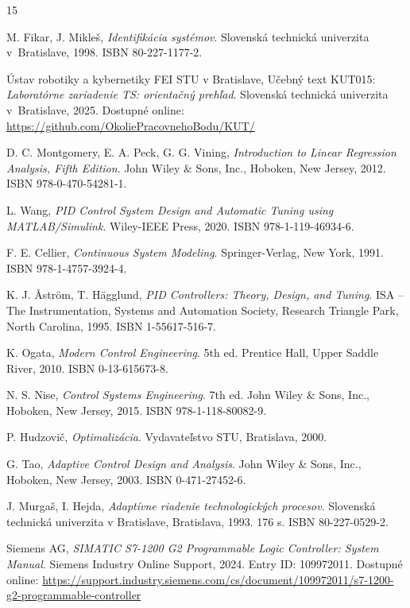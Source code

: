 \clearpage
{}

\begin{thebibliography}{15}

M. Fikar, J. Mikleš, \textit{Identifikácia systémov}.  
Slovenská technická univerzita v~Bratislave, 1998.  
ISBN 80-227-1177-2.  

Ústav robotiky a kybernetiky FEI STU v Bratislave, Učebný text KUT015: \textit{Laboratórne zariadenie TS: orientačný prehľad}.  
Slovenská technická univerzita v~Bratislave, 2025.  
Dostupné online:  
\url{https://github.com/OkoliePracovnehoBodu/KUT/}

D. C. Montgomery, E. A. Peck, G. G. Vining,  
\textit{Introduction to Linear Regression Analysis, Fifth Edition}.  
John Wiley \& Sons, Inc., Hoboken, New Jersey, 2012.  
ISBN 978-0-470-54281-1.  

L. Wang, \textit{PID Control System Design and Automatic Tuning using MATLAB/Simulink}.  
Wiley-IEEE Press, 2020.  
ISBN 978-1-119-46934-6.

F. E. Cellier, \textit{Continuous System Modeling}.  
Springer-Verlag, New York, 1991.  
ISBN 978-1-4757-3924-4.

K. J. Åström, T. Hägglund, \textit{PID Controllers: Theory, Design, and Tuning}.  
ISA -- The Instrumentation, Systems and Automation Society, Research Triangle Park, North Carolina, 1995.  
ISBN 1-55617-516-7.

K. Ogata, \textit{Modern Control Engineering}.  
5th ed.  
Prentice Hall, Upper Saddle River, 2010.  
ISBN 0-13-615673-8.

N. S. Nise, \textit{Control Systems Engineering}.  
7th ed.  
John Wiley \& Sons, Inc., Hoboken, New Jersey, 2015.  
ISBN 978-1-118-80082-9.

P. Hudzovič, \textit{Optimalizácia}.  
Vydavateľstvo STU, Bratislava, 2000.

G. Tao, \textit{Adaptive Control Design and Analysis}.  
John Wiley \& Sons, Inc., Hoboken, New Jersey, 2003.  
ISBN 0-471-27452-6.

J. Murgaš, I. Hejda, \textit{Adaptívne riadenie technologických procesov}.  
Slovenská technická univerzita v Bratislave, Bratislava, 1993.  
176 s.  
ISBN 80-227-0529-2.

Siemens AG, \textit{SIMATIC S7-1200 G2 Programmable Logic Controller: System Manual}.  
Siemens Industry Online Support, 2024.  
Entry ID: 109972011.  
Dostupné online:  
\url{https://support.industry.siemens.com/cs/document/109972011/s7-1200-g2-programmable-controller}

\end{thebibliography}



